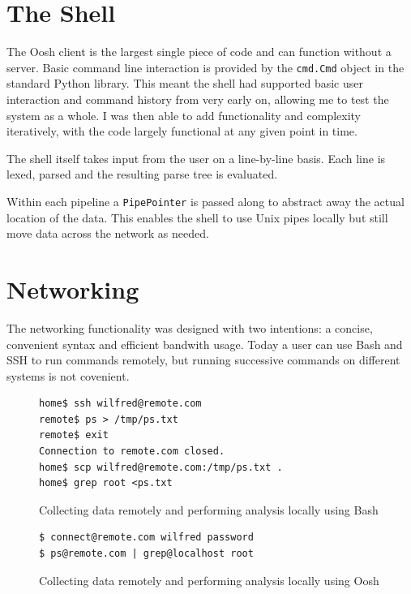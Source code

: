 \documentclass[12pt,twoside,notitlepage]{report}
\begin{document}
\section{The Shell}
The Oosh client is the largest single piece of code and can function without a
server. Basic command line interaction is provided by the {\tt cmd.Cmd} object
in the standard Python library. This meant the shell had supported basic user
interaction and command history from very early on, allowing me to test the
system as a whole. I was then able to add functionality and complexity
iteratively, with the code largely functional at any given point in time.

The shell itself takes input from the user on a line-by-line basis. Each line is
lexed, parsed and the resulting parse tree is evaluated.

Within each pipeline %
a {\tt PipePointer} is passed along to abstract away the actual location of the
data. This enables the shell to use Unix pipes locally %
but still move data across the network as needed.

\section{Networking}
\label{networking}

The networking functionality was designed with two intentions: a concise,
convenient syntax and efficient bandwith usage. Today a user can use Bash and
SSH to run commands remotely, but running successive commands on different
systems is not covenient.

\begin{figure}
\caption{Collecting data remotely and performing analysis locally
  using Bash}
\begin{verbatim}
home$ ssh wilfred@remote.com
remote$ ps > /tmp/ps.txt
remote$ exit
Connection to remote.com closed.
home$ scp wilfred@remote.com:/tmp/ps.txt .
home$ grep root <ps.txt 
\end{verbatim}
\end{figure}

\begin{figure}
\caption{Collecting data remotely and performing analysis locally
  using Oosh}
\begin{verbatim}
$ connect@remote.com wilfred password
$ ps@remote.com | grep@localhost root
\end{verbatim}
\end{figure}
\end{document}
